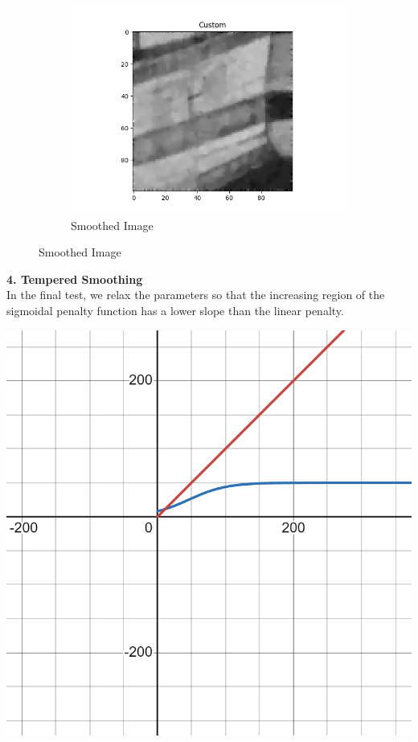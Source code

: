 \documentclass{article}
\begin{document}
\begin{center}
\begin{figure}[!htb]
\begin{center}
        \hfill
        \begin{subfigure}[b]{0.5\textwidth}
          \includegraphics[width=\textwidth]{../generated_images/Custom_test3.png}
          \caption{Smoothed Image}
        \end{subfigure}
      \end{center}
    \end{figure}
  \end{center}

  \newpage
  \noindent
  \textbf{4. Tempered Smoothing}\\
  In the final test, we relax the parameters so that the increasing
  region of the sigmoidal penalty function has a lower slope
  than the linear penalty.\\
  \begin{center}
    \includegraphics[scale=0.2]{../report_images/tempered_smoothing.png}\\
  \end{center}
  \vspace{12pt}
\end{document}
